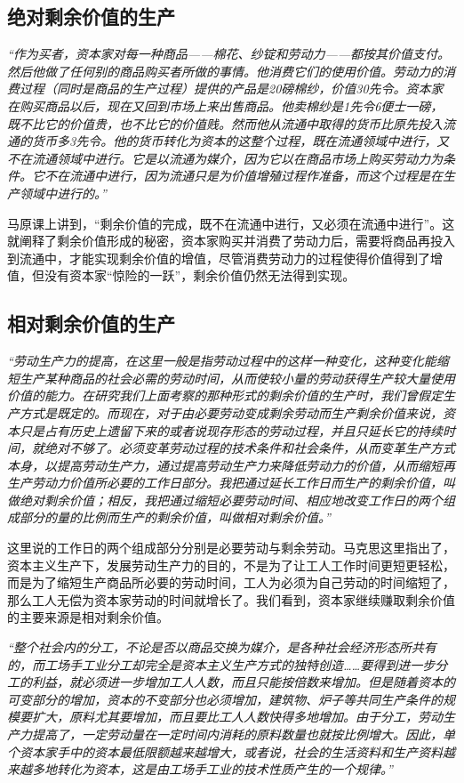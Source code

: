 \documentclass[a4paper]{article}
\begin{document}
\subsection{绝对剩余价值的生产}
\emph{“作为买者，资本家对每一种商品——棉花、纱锭和劳动力——都按其价值支付。然后他做了任何别的商品购买者所做的事情。他消费它们的使用价值。劳动力的消费过程（同时是商品的生产过程）提供的产品是20磅棉纱，价值30先令。资本家在购买商品以后，现在又回到市场上来出售商品。他卖棉纱是1先令6便士一磅，既不比它的价值贵，也不比它的价值贱。然而他从流通中取得的货币比原先投入流通的货币多3先令。他的货币转化为资本的这整个过程，既在流通领域中进行，又不在流通领域中进行。它是以流通为媒介，因为它以在商品市场上购买劳动力为条件。它不在流通中进行，因为流通只是为价值增殖过程作准备，而这个过程是在生产领域中进行的。”}

马原课上讲到，“剩余价值的完成，既不在流通中进行，又必须在流通中进行”。这就阐释了剩余价值形成的秘密，资本家购买并消费了劳动力后，需要将商品再投入到流通中，才能实现剩余价值的增值，尽管消费劳动力的过程使得价值得到了增值，但没有资本家“惊险的一跃”，剩余价值仍然无法得到实现。
\subsection{相对剩余价值的生产}
\emph{“劳动生产力的提高，在这里一般是指劳动过程中的这样一种变化，这种变化能缩短生产某种商品的社会必需的劳动时间，从而使较小量的劳动获得生产较大量使用价值的能力。在研究我们上面考察的那种形式的剩余价值的生产时，我们曾假定生产方式是既定的。而现在，对于由必要劳动变成剩余劳动而生产剩余价值来说，资本只是占有历史上遗留下来的或者说现存形态的劳动过程，并且只延长它的持续时间，就绝对不够了。必须变革劳动过程的技术条件和社会条件，从而变革生产方式本身，以提高劳动生产力，通过提高劳动生产力来降低劳动力的价值，从而缩短再生产劳动力价值所必要的工作日部分。我把通过延长工作日而生产的剩余价值，叫做绝对剩余价值；相反，我把通过缩短必要劳动时间、相应地改变工作日的两个组成部分的量的比例而生产的剩余价值，叫做相对剩余价值。”}

这里说的工作日的两个组成部分分别是必要劳动与剩余劳动。马克思这里指出了，资本主义生产下，发展劳动生产力的目的，不是为了让工人工作时间更短更轻松，而是为了缩短生产商品所必要的劳动时间，工人为必须为自己劳动的时间缩短了，那么工人无偿为资本家劳动的时间就增长了。我们看到，资本家继续赚取剩余价值的主要来源是相对剩余价值。

\emph{“整个社会内的分工，不论是否以商品交换为媒介，是各种社会经济形态所共有的，而工场手工业分工却完全是资本主义生产方式的独特创造……要得到进一步分工的利益，就必须进一步增加工人人数，而且只能按倍数来增加。但是随着资本的可变部分的增加，资本的不变部分也必须增加，建筑物、炉子等共同生产条件的规模要扩大，原料尤其要增加，而且要比工人人数快得多地增加。由于分工，劳动生产力提高了，一定劳动量在一定时间内消耗的原料数量也就按比例增大。因此，单个资本家手中的资本最低限额越来越增大，或者说，社会的生活资料和生产资料越来越多地转化为资本，这是由工场手工业的技术性质产生的一个规律。”}
\end{document}
